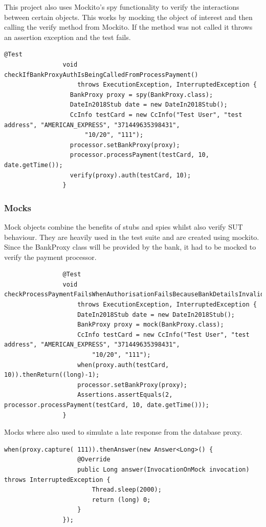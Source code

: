 \documentclass[11pt, a4paper]{article}
\begin{document}
            This project also uses Mockito's spy functionality to verify the interactions between certain objects. This works by mocking the object of interest and then calling the verify method from Mockito. If the method was not called it throws an assertion exception and the test fails.
            \begin{lstlisting}[caption=Using mockito to spy on the bank proxy]
                @Test
                void checkIfBankProxyAuthIsBeingCalledFromProcessPayment()
                    throws ExecutionException, InterruptedException {
                  BankProxy proxy = spy(BankProxy.class);
                  DateIn2018Stub date = new DateIn2018Stub();
                  CcInfo testCard = new CcInfo("Test User", "test address", "AMERICAN_EXPRESS", "371449635398431",
                      "10/20", "111");
                  processor.setBankProxy(proxy);
                  processor.processPayment(testCard, 10, date.getTime());
                  verify(proxy).auth(testCard, 10);
                } 
            \end{lstlisting}
        \subsubsection{Mocks}
            Mock objects combine the benefits of stubs and spies whilst also verify SUT behaviour. They are heavily used in the test suite and are created using mockito. Since the BankProxy class will be provided by the bank, it had to be mocked to verify the payment processor.
            \begin{lstlisting}
                @Test
                void checkProcessPaymentFailsWhenAuthorisationFailsBecauseBankDetailsInvalid()
                    throws ExecutionException, InterruptedException {
                    DateIn2018Stub date = new DateIn2018Stub();
                    BankProxy proxy = mock(BankProxy.class);
                    CcInfo testCard = new CcInfo("Test User", "test address", "AMERICAN_EXPRESS", "371449635398431",
                        "10/20", "111");
                    when(proxy.auth(testCard, 10)).thenReturn((long)-1);
                    processor.setBankProxy(proxy);
                    Assertions.assertEquals(2, processor.processPayment(testCard, 10, date.getTime()));
                }
            \end{lstlisting}
            Mocks where also used to simulate a late response from the database proxy.
            \begin{lstlisting}[caption=Delaying responses from bank proxy]
                when(proxy.capture( 111)).thenAnswer(new Answer<Long>() {
                    @Override
                    public Long answer(InvocationOnMock invocation) throws InterruptedException {
                        Thread.sleep(2000);
                        return (long) 0;
                    }
                });
            \end{lstlisting}
\end{document}
